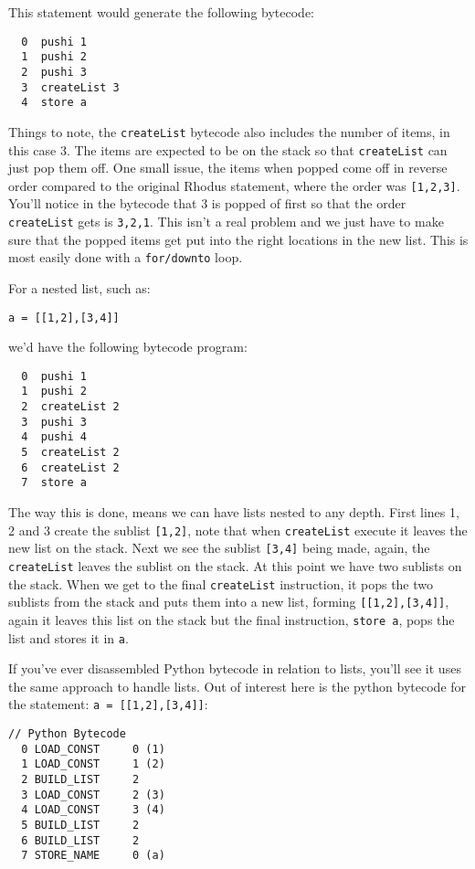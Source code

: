 This statement would generate the following bytecode:

\begin{lstlisting}
  0  pushi 1
  1  pushi 2
  2  pushi 3
  3  createList 3
  4  store a
\end{lstlisting}

Things to note, the {\tt createList} bytecode also includes the number of items, in this case 3. The items are expected to be on the stack so that {\tt createList} can just pop them off. One small issue, the items when popped come off in reverse order compared to the original Rhodus statement, where the order was {\tt [1,2,3]}. You'll notice in the bytecode that 3 is popped of first so that the order {\tt createList} gets is {\tt 3,2,1}. This isn't a real problem and we just have to make sure that the popped items get put into the right locations in the new list. This is most easily done with a {\tt for/downto} loop.

For a nested list, such as:

\begin{lstlisting}
a = [[1,2],[3,4]]
\end{lstlisting}

we'd have the following bytecode program:

\begin{lstlisting}
  0  pushi 1
  1  pushi 2
  2  createList 2
  3  pushi 3
  4  pushi 4
  5  createList 2
  6  createList 2
  7  store a
\end{lstlisting}

The way this is done, means we can have lists nested to any depth. First lines 1, 2 and 3 create the sublist {\tt [1,2]}, note that when {\tt createList} execute it leaves the new list on the stack. Next we see the sublist {\tt [3,4]} being made, again, the {\tt createList} leaves the sublist on the stack. At this point we have two sublists on the stack. When we get to the final {\tt createList} instruction, it pops the two sublists from the stack and puts them into a new list, forming {\tt [[1,2],[3,4]]}, again it leaves this list on the stack but the final instruction, {\tt store a}, pops the list and stores it in {\tt a}.

If you've ever disassembled Python bytecode in relation to lists, you'll see it uses the same approach to handle lists. Out of interest here is the python bytecode for the statement: {\tt a = [[1,2],[3,4]]}:

\begin{lstlisting}
// Python Bytecode
  0 LOAD_CONST     0 (1)
  1 LOAD_CONST     1 (2)
  2 BUILD_LIST     2
  3 LOAD_CONST     2 (3)
  4 LOAD_CONST     3 (4)
  5 BUILD_LIST     2
  6 BUILD_LIST     2
  7 STORE_NAME     0 (a)
\end{lstlisting}

